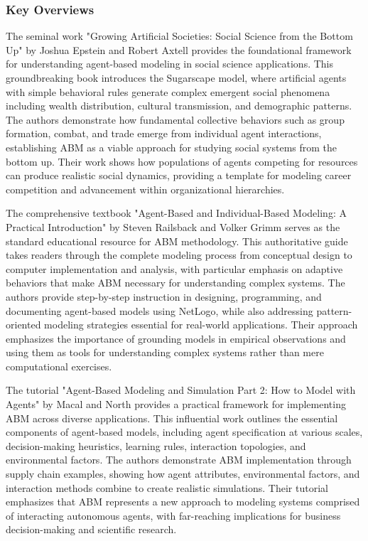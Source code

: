 \documentclass[main.tex]{subfiles}
\begin{document}
\subsubsection{Key Overviews}

The seminal work "Growing Artificial Societies: Social Science from the Bottom Up" by Joshua Epstein and Robert Axtell provides the foundational framework for understanding agent-based modeling in social science applications\parencite{epstein_axtell_mit,epstein_axtell_mit_direct,brookings_artificial,complexity_explorer}. This groundbreaking book introduces the Sugarscape model, where artificial agents with simple behavioral rules generate complex emergent social phenomena including wealth distribution, cultural transmission, and demographic patterns. The authors demonstrate how fundamental collective behaviors such as group formation, combat, and trade emerge from individual agent interactions, establishing ABM as a viable approach for studying social systems from the bottom up. Their work shows how populations of agents competing for resources can produce realistic social dynamics, providing a template for modeling career competition and advancement within organizational hierarchies.

The comprehensive textbook "Agent-Based and Individual-Based Modeling: A Practical Introduction" by Steven Railsback and Volker Grimm serves as the standard educational resource for ABM methodology\parencite{railsback_grimm}. This authoritative guide takes readers through the complete modeling process from conceptual design to computer implementation and analysis, with particular emphasis on adaptive behaviors that make ABM necessary for understanding complex systems. The authors provide step-by-step instruction in designing, programming, and documenting agent-based models using NetLogo, while also addressing pattern-oriented modeling strategies essential for real-world applications. Their approach emphasizes the importance of grounding models in empirical observations and using them as tools for understanding complex systems rather than mere computational exercises.

The tutorial "Agent-Based Modeling and Simulation Part 2: How to Model with Agents" by Macal and North provides a practical framework for implementing ABM across diverse applications\parencite{macal_north}. This influential work outlines the essential components of agent-based models, including agent specification at various scales, decision-making heuristics, learning rules, interaction topologies, and environmental factors. The authors demonstrate ABM implementation through supply chain examples, showing how agent attributes, environmental factors, and interaction methods combine to create realistic simulations. Their tutorial emphasizes that ABM represents a new approach to modeling systems comprised of interacting autonomous agents, with far-reaching implications for business decision-making and scientific research.
\end{document}

